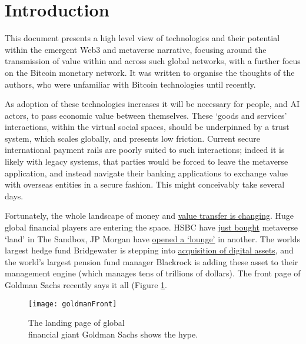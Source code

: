\documentclass[
	12pt, %
	fleqn, %
	a4paper, %
	oneside, %
]{LegrandOrangeBook}
\begin{document}
\section{Introduction}
This document presents a high level view of technologies and their potential within the emergent Web3 and metaverse narrative, focusing around the transmission of value within and across such global networks, with a further focus on the Bitcoin monetary network. It was written to organise the thoughts of the authors, who were unfamiliar with Bitcoin technologies until recently.\par
As adoption of these technologies increases it will be necessary for people, and AI actors, to pass economic value between themselves. These `goods and services' interactions, within the virtual social spaces, should be underpinned by a trust system, which scales globally, and presents low friction. Current secure international payment rails are poorly suited to such interactions; indeed it is likely with legacy systems, that parties would be forced to leave the metaverse application, and instead navigate their banking applications to exchange value with overseas entities in a secure fashion. This might conceivably take several days.\par 
Fortunately, the whole landscape of money and \href{https://www.omfif.org/futureofpayments2021/}{value transfer is changing}. Huge global financial players are entering the space. HSBC have \href{https://sandboxgame.medium.com/hsbc-to-become-the-first-global-financial-services-provider-to-enter-the-sandbox-c066e4f48163}{just bought} metaverse `land' in The Sandbox, JP Morgan have \href{https://www.forbes.com/sites/ronshevlin/2022/02/16/jpmorgan-opens-a-bank-branch-in-the-metaverse-but-its-not-for-what-you-think-its-for/?sh=2fbd1e90158d}{opened a `lounge'} in another. The worlds largest hedge fund Bridgewater is stepping into \href{https://uk.finance.yahoo.com/news/bitcoin-latest-price-crypto-ray-dalio-bridgewater-investment-fund-ethereum-094946686.html}{acquisition of digital assets}, and the world's largest pension fund manager Blackrock is adding these asset to their management engine (which manages tens of trillions of dollars). The front page of Goldman Sachs recently says it all (Figure \ref{fig:goldmanFront}.\par
\begin{figure}[ht]\centering %
	\texttt{[image: goldmanFront]}
	\caption{The landing page of global\\financial giant Goldman Sachs shows the hype.}
	\label{fig:goldmanFront}
\end{figure}
\end{document}

